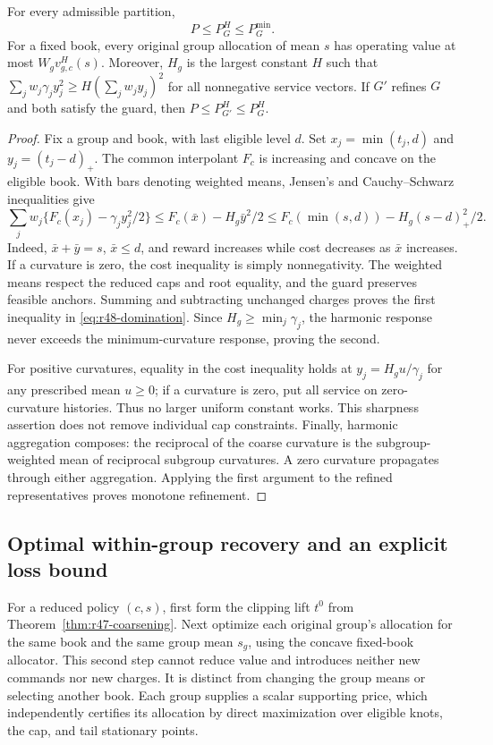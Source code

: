 \begin{theorem}\label{thm:r48-harmonic}
For every admissible partition,
\begin{equation}\label{eq:r48-domination}
 P\leq P_G^H\leq P_G^{\min}.
\end{equation}
For a fixed book, every original group allocation of mean $s$ has operating value at most $W_gv^H_{g,c}(s)$. Moreover, $H_g$ is the largest constant $H$ such that
$\sum_jw_j\gamma_jy_j^2\geq H(\sum_jw_jy_j)^2$ for all nonnegative service vectors. If $G'$ refines $G$ and both satisfy the guard, then $P\leq P_{G'}^H\leq P_G^H$.
\end{theorem}
\begin{proof}
Fix a group and book, with last eligible level $d$. Set $x_j=\min(t_j,d)$ and $y_j=(t_j-d)_+$. The common interpolant $F_c$ is increasing and concave on the eligible book. With bars denoting weighted means, Jensen's and Cauchy--Schwarz inequalities give
\[
 \sum_jw_j\{F_c(x_j)-\gamma_jy_j^2/2\}
 \leq F_c(\bar x)-H_g\bar y^2/2
 \leq F_c(\min(s,d))-H_g(s-d)_+^2/2.
\]
Indeed, $\bar x+\bar y=s$, $\bar x\leq d$, and reward increases while cost decreases as $\bar x$ increases. If a curvature is zero, the cost inequality is simply nonnegativity. The weighted means respect the reduced caps and root equality, and the guard preserves feasible anchors. Summing and subtracting unchanged charges proves the first inequality in \eqref{eq:r48-domination}. Since $H_g\geq\min_j\gamma_j$, the harmonic response never exceeds the minimum-curvature response, proving the second.

For positive curvatures, equality in the cost inequality holds at $y_j=H_g u/\gamma_j$ for any prescribed mean $u\geq0$; if a curvature is zero, put all service on zero-curvature histories. Thus no larger uniform constant works. This sharpness assertion does not remove individual cap constraints. Finally, harmonic aggregation composes: the reciprocal of the coarse curvature is the subgroup-weighted mean of reciprocal subgroup curvatures. A zero curvature propagates through either aggregation. Applying the first argument to the refined representatives proves monotone refinement.
\end{proof}

\subsection{Optimal within-group recovery and an explicit loss bound}
For a reduced policy $(c,s)$, first form the clipping lift $t^0$ from Theorem~\ref{thm:r47-coarsening}. Next optimize each original group's allocation for the same book and the same group mean $s_g$, using the concave fixed-book allocator. This second step cannot reduce value and introduces neither new commands nor new charges. It is distinct from changing the group means or selecting another book. Each group supplies a scalar supporting price, which independently certifies its allocation by direct maximization over eligible knots, the cap, and tail stationary points.

